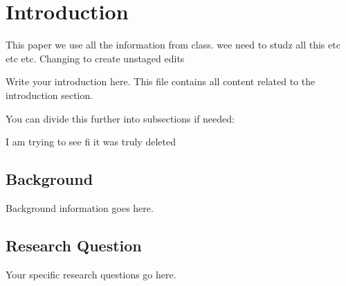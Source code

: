 \section{Introduction}
\label{sec:introduction}

This paper we use all the information from class.
wee need to studz all this etc etc etc. Changing to create unstaged edits

Write your introduction here. This file contains all content related to the introduction section.

You can divide this further into subsections if needed:


I am trying to see fi it was truly deleted

\subsection{Background}
Background information goes here.

\subsection{Research Question}
Your specific research questions go here.
